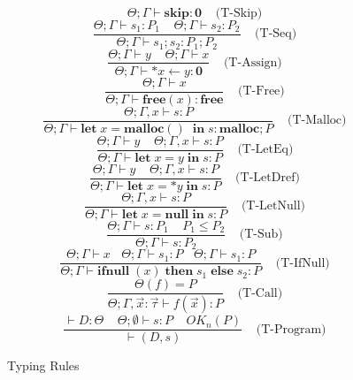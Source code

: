 \documentclass[english]{jssst_ppl} %
\newcommand\LET{\mathbf{let}\;}
\newcommand\IN{\mathbf{in}\;}
\newcommand\SKIP{\mathbf{skip}}
\newcommand\Rtab{\; \; \; \;}
\newcommand\IFNULL{\mathbf{ifnull}\;}
\newcommand\THEN{\mathbf{then}\;}
\newcommand\ELSE{\mathbf{else}\;}
\newcommand\MALLOC{\mathbf{malloc()}\;}
\newcommand\Malloc{\mathbf{malloc}}
\newcommand\Free{\mathbf{free}}
\theoremstyle{definition}
\begin{document}
\begin{figure}
\begin{boxedminipage}{12cm}
  \scriptsize

$$
         \Theta ; \Gamma \vdash \SKIP : \mathbf{0}
      \Rtab \mbox{(T-Skip)}
$$
$$
      \frac{\Theta ; \Gamma \vdash s_{1} : P_{1} \Rtab \Theta ; \Gamma \vdash s_{2} : P_{2}}
          {\Theta ; \Gamma \vdash s_{1} ; s_{2} : P_{1};P_{2} }
     \Rtab \mbox{(T-Seq)}
$$
$$
     \frac{\Theta ; \Gamma \vdash y  \Rtab \Theta ; \Gamma \vdash x }
          {\Theta ; \Gamma \vdash *x \leftarrow y : \mathbf{0} }
     \Rtab \mbox{(T-Assign)}
$$
$$
     \frac{\Theta ; \Gamma \vdash x  }
           {\Theta ; \Gamma \vdash \Free(x) : \Free}
     \Rtab \mbox{(T-Free)}
$$
$$
     \frac{\Theta ; \Gamma,x \vdash s : P}
           {\Theta ; \Gamma \vdash \LET x = \MALLOC \; \IN s  : \Malloc;P}
           \Rtab \mbox{(T-Malloc)}
$$
$$
     \frac{\Theta ; \Gamma \vdash y   \Rtab \Theta ; \Gamma , x  \vdash s : P}
           {\Theta ; \Gamma \vdash \LET x = y \; \IN s : P}
     \Rtab \mbox{(T-LetEq)}
$$
$$
     \frac{\Theta ; \Gamma \vdash y  \Rtab \Theta ; \Gamma , x  \vdash s : P}
           {\Theta ; \Gamma \vdash \LET x = *y \; \IN s : P}
     \Rtab \mbox{(T-LetDref)}
$$
$$
     \frac{\Theta ; \Gamma, x  \vdash s : P}
           {\Theta ; \Gamma \vdash \LET x = \mathbf{null} \; \IN s : P}
     \Rtab \mbox{(T-LetNull)}
$$
$$
     \frac{\Theta ; \Gamma \vdash s : P_{1} \Rtab P_{1} \le P_{2}}
            {\Theta ; \Gamma \vdash s : P_{2}}
     \Rtab \mbox{(T-Sub)}
$$
$$
     \frac{\Theta ; \Gamma \vdash x    \ \ \ \  \Theta ; \Gamma \vdash s_{1} : P \ \ \ \ \Theta ; \Gamma \vdash s_{1} : P}
           {\Theta ; \Gamma \vdash \IFNULL(x) \; \THEN s_{1}\; \ELSE s_{2} : P}
     \Rtab \mbox{(T-IfNull)}
$$
$$ \frac{ \Theta(f) = P}
{\Theta; \Gamma, \vec{x} : \vec{\tau} \vdash f(\vec{x}) : P}
\Rtab \mbox{(T-Call)} $$
$$\frac{\vdash D : \Theta \;\;\;\; \Theta; \emptyset\vdash s : P \Rtab OK_{n}(P)}
{\vdash (D, s)}
\Rtab \mbox{(T-Program)} $$
\end{boxedminipage}
\caption{Typing Rules}
\label{fig:typingrules}
\end{figure}
\end{document}
